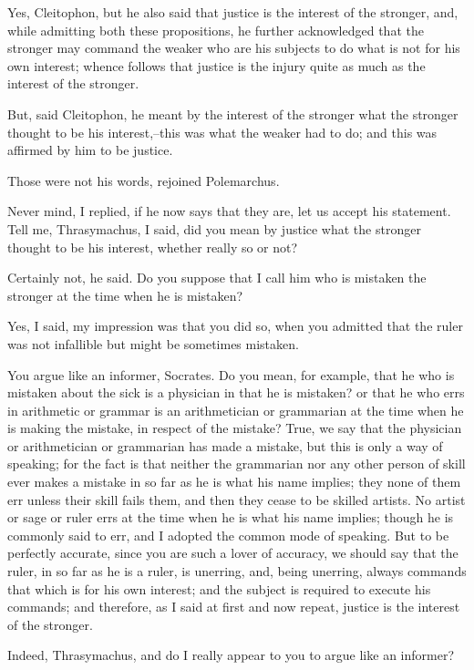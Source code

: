Yes, Cleitophon, but he also said that justice is the interest of the
stronger, and, while admitting both these propositions, he further
acknowledged that the stronger may command the weaker who are his
subjects to do what is not for his own interest; whence follows that
justice is the injury quite as much as the interest of the stronger.

But, said Cleitophon, he meant by the interest of the stronger what the
stronger thought to be his interest,--this was what the weaker had to
do; and this was affirmed by him to be justice.

Those were not his words, rejoined Polemarchus.

Never mind, I replied, if he now says that they are, let us accept his
statement. Tell me, Thrasymachus, I said, did you mean by justice what
the stronger thought to be his interest, whether really so or not?

Certainly not, he said. Do you suppose that I call him who is mistaken
the stronger at the time when he is mistaken?

Yes, I said, my impression was that you did so, when you admitted that
the ruler was not infallible but might be sometimes mistaken.

You argue like an informer, Socrates. Do you mean, for example, that he
who is mistaken about the sick is a physician in that he is mistaken?
or that he who errs in arithmetic or grammar is an arithmetician or
grammarian at the time when he is making the mistake, in respect of the
mistake? True, we say that the physician or arithmetician or grammarian
has made a mistake, but this is only a way of speaking; for the fact is
that neither the grammarian nor any other person of skill ever makes a
mistake in so far as he is what his name implies; they none of them
err unless their skill fails them, and then they cease to be skilled
artists. No artist or sage or ruler errs at the time when he is what
his name implies; though he is commonly said to err, and I adopted the
common mode of speaking. But to be perfectly accurate, since you are
such a lover of accuracy, we should say that the ruler, in so far as he
is a ruler, is unerring, and, being unerring, always commands that which
is for his own interest; and the subject is required to execute his
commands; and therefore, as I said at first and now repeat, justice is
the interest of the stronger.

Indeed, Thrasymachus, and do I really appear to you to argue like an
informer?

